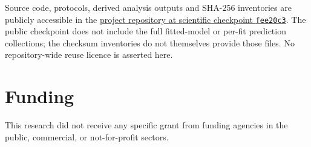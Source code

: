 \documentclass[a4paper,fleqn]{cas-dc}
\begin{document}
Source code, protocols, derived analysis outputs and SHA-256 inventories are
publicly accessible in the
\href{https://github.com/KADOUMAAbdelhak/TimeTrack-Forecasting-Framework/tree/fee20c316040c57b69ba12a193530c955b539771}{project repository at scientific checkpoint \texttt{fee20c3}}.
The public checkpoint does not include the full fitted-model or per-fit
prediction collections; the checksum inventories do not themselves provide
those files. No repository-wide reuse licence is asserted here.

\printcredits

\section*{Funding}

This research did not receive any specific grant from funding agencies in
the public, commercial, or not-for-profit sectors.




\end{document}
